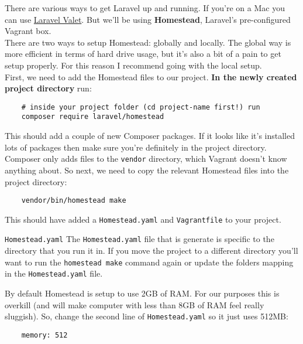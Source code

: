 There are various ways to get Laravel up and running. If you're on a Mac you can use \href{https://laravel.com/docs/master/valet}{Laravel Valet}. But we'll be using \textbf{Homestead}, Laravel's pre-configured Vagrant box.
\\

There are two ways to setup Homestead: globally and locally. The global way is more efficient in terms of hard drive usage, but it's also a bit of a pain to get setup properly. For this reason I recommend going with the local setup.
\\

First, we need to add the Homestead files to our project. \textbf{In the newly created project directory} run:

\begin{verbatim}
    # inside your project folder (cd project-name first!) run
    composer require laravel/homestead
\end{verbatim}

This should add a couple of new Composer packages. If it looks like it's installed lots of packages then make sure you're definitely in the project directory.
\\

Composer only adds files to the \texttt{vendor} directory, which Vagrant doesn't know anything about. So next, we need to copy the relevant Homestead files into the project directory:

\begin{verbatim}
    vendor/bin/homestead make
\end{verbatim}

This should have added a \texttt{Homestead.yaml} and \texttt{Vagrantfile} to your project.
\\

\begin{infobox}{\texttt{Homestead.yaml}}
    The \texttt{Homestead.yaml} file that is generate is specific to the directory that you run it in. If you move the project to a different directory you'll want to run the \texttt{homestead make} command again or update the folders mapping in the \texttt{Homestead.yaml} file.
\end{infobox}

By default Homestead is setup to use 2GB of RAM. For our purposes this is overkill (and will make computer with less than 8GB of RAM feel really sluggish). So, change the second line of \texttt{Homestead.yaml} so it just uses 512MB:

\begin{verbatim}
    memory: 512
\end{verbatim}

